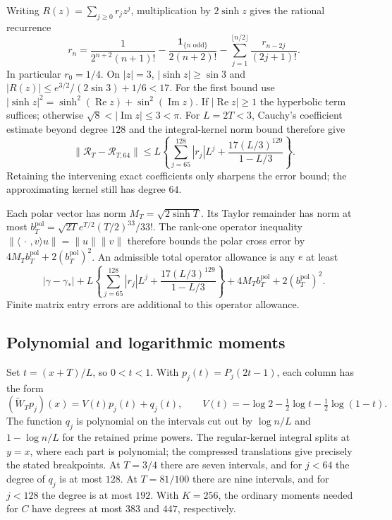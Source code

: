 \documentclass[11pt]{article}
\theoremstyle{definition}
\theoremstyle{remark}
\numberwithin{equation}{section}
\begin{document}
Writing $R(z)=\sum_{j\ge0}r_jz^j$, multiplication by
$2\sinh z$ gives the rational recurrence
\begin{equation}
 r_n=\frac1{2^{n+2}(n+1)!}
    -\frac{\mathbf1_{\{n\text{ odd}\}}}{2(n+2)!}
    -\sum_{j=1}^{\lfloor n/2\rfloor}\frac{r_{n-2j}}{(2j+1)!}.
 \label{eq:window-r-recurrence}
\end{equation}
In particular $r_0=1/4$.  On $|z|=3$,
$|\sinh z|\ge\sin3$ and
$|R(z)|\le e^{3/2}/(2\sin3)+1/6<17$.
For the first bound use $|\sinh z|^2=
\sinh^2(\operatorname{Re}z)+\sin^2(\operatorname{Im}z)$.
If $|\operatorname{Re}z|\ge1$ the hyperbolic term suffices;
otherwise $\sqrt8<|\operatorname{Im}z|\le3<\pi$.
For $L=2T<3$, Cauchy's coefficient estimate beyond degree $128$
and the integral-kernel norm bound therefore give
\begin{equation}
 \|\mathcal R_T-\mathcal R_{T,64}\|
 \le L\left\{\sum_{j=65}^{128}|r_j|L^j
            +\frac{17(L/3)^{129}}{1-L/3}\right\}.
 \label{eq:window-r-error}
\end{equation}
Retaining the intervening exact coefficients only sharpens the
error bound; the approximating kernel still has degree $64$.

Each polar vector has norm $M_T=\sqrt{2\sinh T}$.  Its Taylor
remainder has norm at most
$b_T^{\mathrm{pol}}=\sqrt{2T}e^{T/2}(T/2)^{33}/33!$.
The rank-one operator inequality
$\|\langle\,\cdot\,,v\rangle u\|=\|u\|\|v\|$
therefore bounds the polar cross error by
$4M_Tb_T^{\mathrm{pol}}+2(b_T^{\mathrm{pol}})^2$.
An admissible total operator allowance is any $e$ at least
\begin{equation}
 |\gamma-\gamma_*|
 +L\left\{\sum_{j=65}^{128}|r_j|L^j
            +\frac{17(L/3)^{129}}{1-L/3}\right\}
 +4M_Tb_T^{\mathrm{pol}}+2(b_T^{\mathrm{pol}})^2.
 \label{eq:window-total-error}
\end{equation}
Finite matrix entry errors are additional to this operator allowance.

\subsection{Polynomial and logarithmic moments}

Set $t=(x+T)/L$, so $0<t<1$.  With $p_j(t)=P_j(2t-1)$,
each column has the form
\begin{equation}
 (\widetilde W_Tp_j)(x)=V(t)p_j(t)+q_j(t),\qquad
 V(t)=-\log2-\tfrac12\log t-\tfrac12\log(1-t).
 \label{eq:window-piecewise-column}
\end{equation}
The function $q_j$ is polynomial on the intervals cut out by
$\log n/L$ and $1-\log n/L$ for the retained prime powers.
The regular-kernel integral splits at $y=x$, where each part is
polynomial; the compressed translations give precisely the stated
breakpoints.  At $T=3/4$ there are seven intervals, and for
$j<64$ the degree of $q_j$ is at most $128$.
At $T=81/100$ there are nine intervals, and for $j<128$ the
degree is at most $192$.  With $K=256$, the ordinary moments
needed for $C$ have degrees at most $383$ and $447$, respectively.
\end{document}

